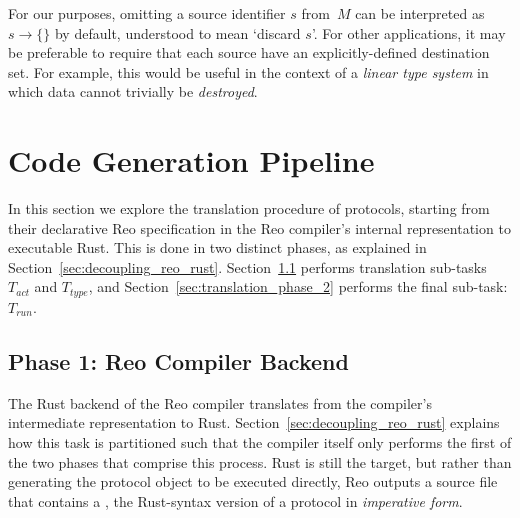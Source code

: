 For our purposes, omitting a source identifier $s$ from~$M$ can be interpreted as $s\rightarrow{}\{\}$ by default, understood to mean `discard $s$'. For other applications, it may be preferable to require that each source have an explicitly-defined destination set. For example, this would be useful in the context of a \textit{linear type system} in which data cannot trivially be \textit{destroyed}. 



\section{Code Generation Pipeline}
In this section we explore the translation procedure of protocols, starting from their declarative Reo specification in the Reo compiler's internal representation to executable Rust. This is done in two distinct phases, as explained in Section~\ref{sec:decoupling_reo_rust}. Section~\ref{sec:translation_phase_1} performs translation sub-tasks $T_{act}$ and $T_{type}$, and Section~\ref{sec:translation_phase_2} performs the final sub-task: $T_{run}$.

\subsection{Phase 1: Reo Compiler Backend}
\label{sec:translation_phase_1}
The Rust backend of the Reo compiler translates from the compiler's intermediate representation to Rust. Section~\ref{sec:decoupling_reo_rust} explains how this task is partitioned such that the compiler itself only performs the first of the two phases that comprise this process. Rust is still the target, but rather than generating the protocol object to be executed directly, Reo outputs a source file that contains a , the Rust-syntax version of a protocol in \textit{imperative form}. 


